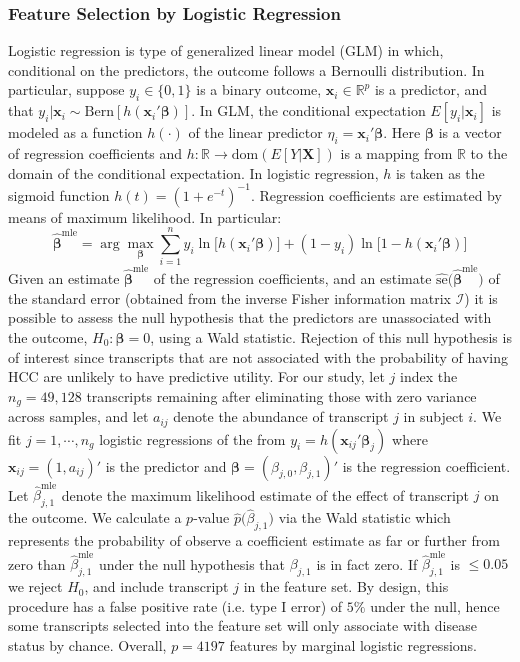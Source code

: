\documentclass[a4paper]{article}
\begin{document}
\subsubsection{Feature Selection by Logistic Regression}
Logistic regression is type of generalized linear model (GLM) in which, conditional on the predictors, the outcome follows a Bernoulli distribution. In particular, suppose $y_{i}\in\{0,1\}$ is a binary outcome, $\bm{x}_{i}\in\mathbb{R}^{p}$ is a predictor, and that $y_{i}|\bm{x}_{i} \sim \text{Bern}[h(\bm{x}_{i}'\bm{\beta})]$. In GLM, the conditional expectation $E[y_{i}|\bm{x}_{i}]$ is modeled as a function $h(\cdot)$ of the linear predictor $\eta_{i} = \bm{x}_{i}'\bm{\beta}$. Here $\bm{\beta}$ is a vector of regression coefficients and $h : \mathbb{R} \to \text{dom}(E[Y|\bm{X}])$ is a mapping from $\mathbb{R}$ to the domain of the conditional expectation. In logistic regression, $h$ is taken as the sigmoid function $h(t) = (1+e^{-t})^{-1}$. Regression coefficients are estimated by means of maximum likelihood. In particular:
\begin{equation}
\bm{\hat{\beta}}^{\text{mle}} = \arg\max_{\bm{\beta}}\sum_{i=1}^{n}y_{i}\ln\big[ h(\bm{x}_{i}'\bm{\beta}) \big] + (1-y_{i})\ln\big[1-h(\bm{x}_{i}'\bm{\beta})\big]
\end{equation}
Given an estimate $\bm{\hat{\beta}}^{\text{mle}}$ of the regression coefficients, and an estimate $\hat{\text{se}}\big(\bm{\hat{\beta}}^{\text{mle}}\big)$ of the standard error (obtained from the inverse Fisher information matrix $\bm{\mathcal{I}}$) it is possible to assess the null hypothesis that the predictors are unassociated with the outcome, $H_{0}:\bm{\beta}=0$, using a Wald statistic. Rejection of this null hypothesis is of interest since transcripts that are not associated with the probability of having HCC are unlikely to have predictive utility. For our study, let $j$ index the $n_{g} = 49,128$ transcripts remaining after eliminating those with zero variance across samples, and let $a_{ij}$ denote the abundance of transcript $j$ in subject $i$. We fit $j=1,\cdots,n_{g}$ logistic regressions of the from $y_{i} = h(\bm{x}_{ij}'\bm{\beta}_{j})$ where $\bm{x}_{ij} = (1,a_{ij})'$ is the predictor and $\bm{\beta} = (\beta_{j,0},\beta_{j,1})'$ is the regression coefficient. Let $\hat{\beta}_{j,1}^{\text{mle}}$ denote the maximum likelihood estimate of the effect of transcript $j$ on the outcome. We calculate a $p$-value $\hat{p}\big(\hat{\beta}_{j,1}\big)$ via the Wald statistic which represents the probability of observe a coefficient estimate as far or further from zero than $\hat{\beta}_{j,1}^{\text{mle}}$ under the null hypothesis that $\beta_{j,1}$ is in fact zero. If $\hat{\beta}_{j,1}^{\text{mle}}$ is $\leq 0.05$ we reject $H_{0}$, and include transcript $j$ in the feature set. By design, this procedure has a false positive rate (i.e. type I error) of $5\%$ under the null, hence some transcripts selected into the feature set will only associate with disease status by chance.
Overall, $p = 4197$ features by marginal logistic regressions. 
\end{document}

